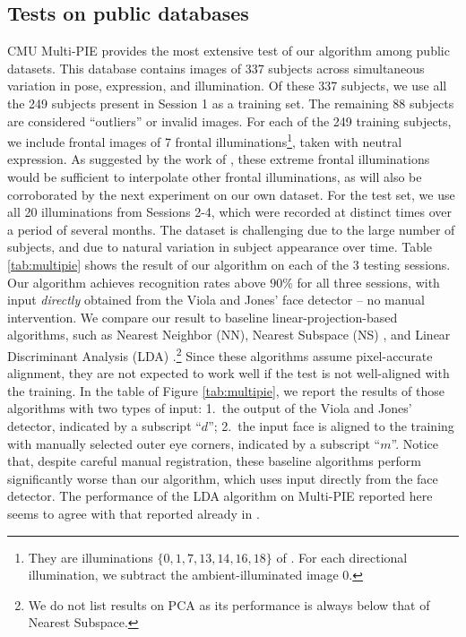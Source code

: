 \documentclass[10pt,twocolumn,letterpaper]{article}
\begin{document}
\subsection{Tests on public databases}\vspace{-2mm}
CMU Multi-PIE provides the most extensive test of our algorithm among public datasets. This database contains images of 337 subjects across simultaneous variation in pose, expression, and illumination. Of these 337 subjects, we use all the 249 subjects present in Session 1 as a training set. The remaining 88 subjects are considered ``outliers'' or invalid images. For each of the 249 training subjects, we include frontal images of 7 frontal illuminations\footnote{They are illuminations $\{0,1,7,13,14,16,18\}$ of \cite{Gross2008-FGR}.  For each directional illumination, we subtract the ambient-illuminated image 0.}, taken with neutral expression. As suggested by the work of \cite{Georghiades2001-PAMI}, these extreme frontal illuminations would be sufficient to interpolate other frontal illuminations, as will also be corroborated by the next experiment on our own dataset. For the test set, we use all 20 illuminations from Sessions 2-4, which were recorded at distinct times over a period of several months. The dataset is challenging due to the large number of subjects, and due to natural variation in subject appearance over time. Table \ref{tab:multipie} shows the result of our algorithm on each of the 3 testing sessions. Our algorithm achieves recognition rates above $90\%$ for all three sessions, with input {\em directly} obtained from the Viola and Jones' face detector -- no manual intervention. We compare our result to baseline linear-projection-based algorithms, such as Nearest Neighbor (NN), Nearest Subspace (NS) \cite{Lee2005-PAMI}, and Linear Discriminant Analysis (LDA) \cite{Belhumeur1997-PAMI}.\footnote{We do not list results on PCA \cite{Turk1991-CVPR} as its performance is always below that of Nearest Subspace.} Since these algorithms assume pixel-accurate alignment, they are not expected to work well if the test is not well-aligned with the training. In the table of Figure \ref{tab:multipie}, we report the results of those algorithms with two types of input: 1.\ the output of the Viola and Jones' detector, indicated by a subscript ``$d$''; 2.\ the input face is aligned to the training with manually selected outer eye corners, indicated by a subscript ``$m$''. Notice that, despite careful manual registration, these baseline algorithms perform significantly worse than our algorithm, which uses input directly from the face detector. The performance of the LDA algorithm on Multi-PIE reported here seems to agree with that reported already in \cite{Gross2008-FGR}.\vspace{-2mm}
\end{document}
